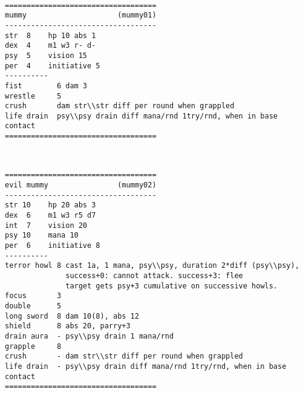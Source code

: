 \

\goodbreak \begin{samepage} \small \begin{verbatim}
===================================
mummy                     (mummy01)
-----------------------------------
str  8    hp 10 abs 1
dex  4    m1 w3 r- d-
psy  5    vision 15
per  4    initiative 5
----------
fist        6 dam 3
wrestle     5
crush       dam str\\str diff per round when grappled
life drain  psy\\psy drain diff mana/rnd 1try/rnd, when in base contact
===================================
\end{verbatim} \normalsize \end{samepage}

\

\goodbreak \begin{samepage} \small \begin{verbatim}
===================================
evil mummy                (mummy02)
-----------------------------------
str 10    hp 20 abs 3
dex  6    m1 w3 r5 d7
int  7    vision 20
psy 10    mana 10
per  6    initiative 8
----------
terror howl 8 cast 1a, 1 mana, psy\\psy, duration 2*diff (psy\\psy),
              success+0: cannot attack. success+3: flee
              target gets psy+3 cumulative on successive howls.
focus       3
double      5
long sword  8 dam 10(8), abs 12
shield      8 abs 20, parry+3
drain aura  - psy\\psy drain 1 mana/rnd
grapple     8
crush       - dam str\\str diff per round when grappled
life drain  - psy\\psy drain diff mana/rnd 1try/rnd, when in base contact
===================================
\end{verbatim} \normalsize \end{samepage}

\








\clearpage
{}

